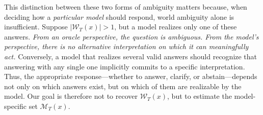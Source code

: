 This distinction between these two forms of ambiguity matters because, when deciding how a \emph{particular model} should respond, world ambiguity alone is insufficient.
Suppose \(|\mathcal{W}_T(x)|>1\), but a model realizes only one of these answers.
\textit{From an oracle perspective, the question is ambiguous. From the model's perspective, there is no alternative interpretation on which it can meaningfully act.}
Conversely, a model that realizes several valid answers should recognize that answering with any single one implicitly commits to a specific interpretation.
Thus, the appropriate response---whether to answer, clarify, or abstain---depends not only on which answers exist, but on which of them are realizable by the model.
Our goal is therefore not to recover \(\mathcal{W}_T(x)\), but to estimate the model-specific set \(\mathcal{M}_T(x)\).








